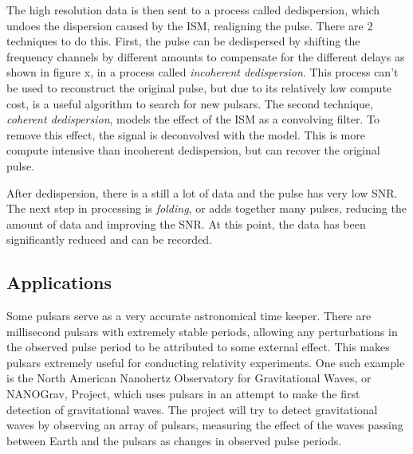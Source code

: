 The high resolution data is then sent to a process called dedispersion, which undoes the dispersion caused by the ISM, realigning the pulse.
There are 2 techniques to do this.
First, the pulse can be dedispersed by shifting the frequency channels by different amounts to compensate for the different delays as shown in figure x, in a process called \emph{incoherent dedispersion}. %
This process can't be used to reconstruct the original pulse, but due to its relatively low compute cost, is a useful algorithm to search for new pulsars.
The second technique, \emph{coherent dedispersion}, models the effect of the ISM as a convolving filter. 
To remove this effect, the signal is deconvolved with the model.
This is more compute intensive than incoherent dedispersion, but can recover the original pulse.

After dedispersion, there is a still a lot of data and the pulse has very low SNR. 
The next step in processing is \emph{folding}, or adds together many pulses, reducing the amount of data and improving the SNR.
At this point, the data has been significantly reduced and can be recorded. 



%
\subsection{Applications}
Some pulsars serve as a very accurate astronomical time keeper.
There are millisecond pulsars with extremely stable periods, allowing any perturbations in the observed pulse period to be attributed to some external effect.
This makes pulsars extremely useful for conducting relativity experiments. 
One such example is the North American Nanohertz Observatory for Gravitational Waves, or NANOGrav, Project, %
which uses pulsars in an attempt to make the first detection of gravitational waves. 
The project will try to detect gravitational waves by observing an array of pulsars, measuring the effect of the waves passing between Earth and the pulsars as changes in observed pulse periods.


